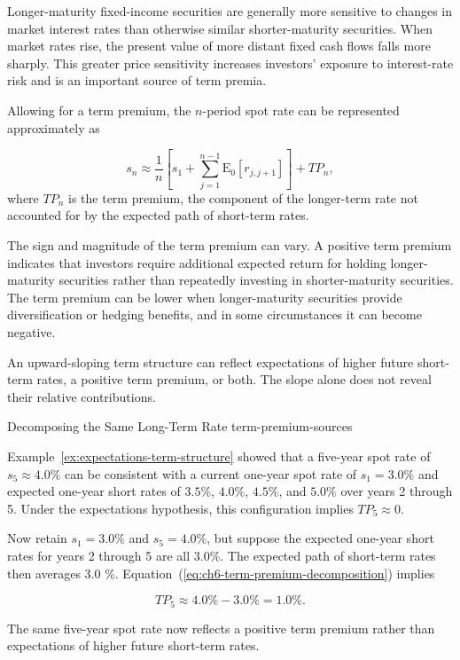 Longer-maturity fixed-income securities are generally more sensitive to changes in market interest rates than otherwise similar shorter-maturity securities. When market rates rise, the present value of more distant fixed cash flows falls more sharply. This greater price sensitivity increases investors' exposure to interest-rate risk and is an important source of term premia.

Allowing for a term premium, the $n$-period spot rate can be represented approximately as

\begin{equation}
s_n
\approx
\frac{1}{n}
\left[
s_1
+
\sum_{j=1}^{n-1}
\mathrm{E}_0[r_{j,j+1}]
\right]
+
TP_n,
\label{eq:ch6-term-premium-decomposition}
\end{equation}
where $TP_n$ is the term premium, the component of the longer-term rate not accounted for by the expected path of short-term rates.

The sign and magnitude of the term premium can vary. A positive term premium indicates that investors require additional expected return for holding longer-maturity securities rather than repeatedly investing in shorter-maturity securities. The term premium can be lower when longer-maturity securities provide diversification or hedging benefits, and in some circumstances it can become negative.

An upward-sloping term structure can reflect expectations of higher future short-term rates, a positive term premium, or both. The slope alone does not reveal their relative contributions.

\begin{example}
{Decomposing the Same Long-Term Rate}
{term-premium-sources}

Example~\ref{ex:expectations-term-structure} showed that a five-year spot rate of $s_5\approx4.0\%$ can be consistent with a current one-year spot rate of $s_1=3.0\%$ and expected one-year short rates of $3.5\%$, $4.0\%$, $4.5\%$, and $5.0\%$ over years 2 through 5. Under the expectations hypothesis, this configuration implies $TP_5\approx0$.

Now retain $s_1=3.0\%$ and $s_5=4.0\%$, but suppose the expected one-year short rates for years 2 through 5 are all $3.0\%$. The expected path of short-term rates then averages 3.0 \%. Equation~(\ref{eq:ch6-term-premium-decomposition}) implies

\[
TP_5
\approx
4.0\%-3.0\%
=
1.0\%.
\]

The same five-year spot rate now reflects a positive term premium rather than expectations of higher future short-term rates.

\end{example}

